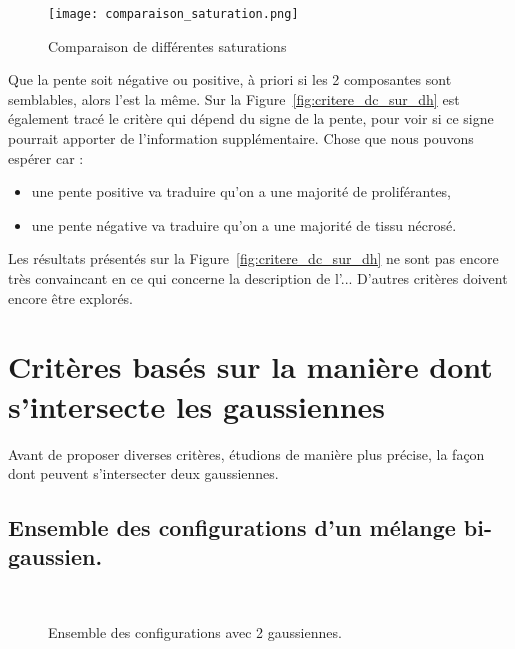 \documentclass[main.tex]{subfiles}
\begin{document}
\begin{figure}
\centering
\texttt{[image: comparaison\_saturation.png]}
\vspace{-5mm}
\caption{\label{fig:comp_saturation}Comparaison de différentes saturations}
\end{figure}

Que la pente soit négative ou positive, à priori si les 2 composantes sont semblables, alors l'\hetero est la même. Sur la Figure~\ref{fig:critere_dc_sur_dh} est également tracé le critère qui dépend du signe de la pente, pour voir si ce signe pourrait apporter de l'information supplémentaire. Chose que nous pouvons espérer car :
\begin{itemize}
\item une pente positive va traduire qu'on a une majorité de proliférantes,
\item une pente négative va traduire qu'on a une majorité de tissu nécrosé.
\end{itemize}

Les résultats présentés sur la Figure~\ref{fig:critere_dc_sur_dh} ne sont pas encore très convaincant en ce qui concerne la description de l'\hetero... D'autres critères doivent encore être explorés.

\section{Critères basés sur la manière dont s'intersecte les gaussiennes}
Avant de proposer diverses critères, étudions de manière plus précise, la façon dont peuvent s'intersecter deux gaussiennes.

\subsection{Ensemble des configurations d'un mélange bi-gaussien.}
\begin{figure}
\qquad
{}\\
\qquad
{}
\caption{\label{fig:config_intersection_gaussienne}Ensemble des configurations avec 2 gaussiennes.}
\end{figure}
\end{document}
